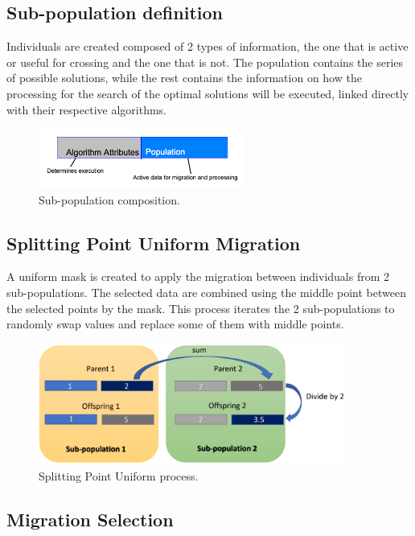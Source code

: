 \documentclass[runningheads]{llncs}
\begin{document}
\subsection{Sub-population definition}

Individuals are created composed of 2 types of information, the one that is
active or useful for crossing and the one that is not. The population contains
the series of possible solutions, while the rest contains the information on how
the processing for the search of the optimal solutions will be executed, linked
directly with their respective algorithms.

\begin{figure}[htp]
  \centering
  \includegraphics[width=0.6\textwidth]{img/subpopulationDefinition.png}
  \caption{Sub-population composition.} \label{fig1}
  \end{figure}

\subsection{Splitting Point Uniform Migration}
A uniform mask is created to apply the migration between individuals from 2
sub-populations. The selected data are combined using the middle point between
the selected points by the mask. This process iterates the 2 sub-populations to
randomly swap values and replace some of them with middle points.


\begin{figure}[htp]
  \centering
  \includegraphics[width=0.9\textwidth]{img/splittinPointUniform.png}
  \caption{Splitting Point Uniform process.} \label{fig1}
  \end{figure}

  \subsection{Migration Selection}
\end{document}
